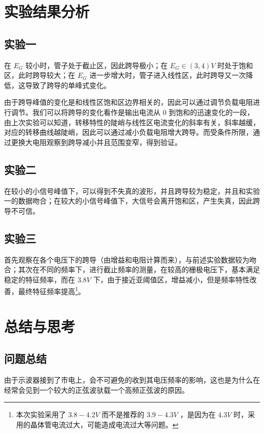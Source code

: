 \documentclass[lang=cn,11pt,a4paper,cite=authoryear]{elegantpaper}
\begin{document}
\section{实验结果分析}

\subsection{实验一}

在 \(E_G\) 较小时，管子处于截止区，因此跨导极小；在 \(E_G \in (3, 4) V \)  时处于饱和区，此时跨导较大；在 \(E_G\) 进一步增大时，管子进入线性区，此时跨导又一次降低，这导致了跨导的单峰式变化。

由于跨导峰值的变化是和线性区饱和区边界相关的，因此可以通过调节负载电阻进行调节。我们可以将跨导的变化看作是输出电流从 \(0\) 到饱和的迅速变化的一段，由上次实验可以知道，转移特性的陡峭与线性区电流变化的斜率有关，斜率越缓，对应的转移曲线越陡峭，因此可以通过减小负载电阻增大跨导。而受条件所限，通过更换大电阻观察到跨导减小并且范围变窄，得到验证。


\subsection{实验二}

在较小的小信号峰值下，可以得到不失真的波形，并且跨导较为稳定，并且和实验一的数据吻合；在较大的小信号峰值下，大信号会离开饱和区，产生失真，因此跨导不可信。


\subsection{实验三}

首先观察在各个电压下的跨导（由增益和电阻计算而来），与前述实验数据较为吻合；其次在不同的频率下，进行截止频率的测量，在较高的栅极电压下，基本满足稳定的特征频率，而在 \(3.8 V\) 下，由于接近亚阈值区，增益减小，但是频率特性改善，最终特征频率提高\footnote{本次实验采用了 \(3.8-4.2V\) 而不是推荐的 \(3.9-4.3 V\) ，是因为在 \(4.3 V\) 时，采用的晶体管电流过大，可能造成电流过大等问题。}。


\section{总结与思考}

\subsection{问题总结}

由于示波器接到了市电上，会不可避免的收到其电压频率的影响，这也是为什么在经常会见到一个较大的正弦波驮载一个高频正弦波的原因。
\end{document}
